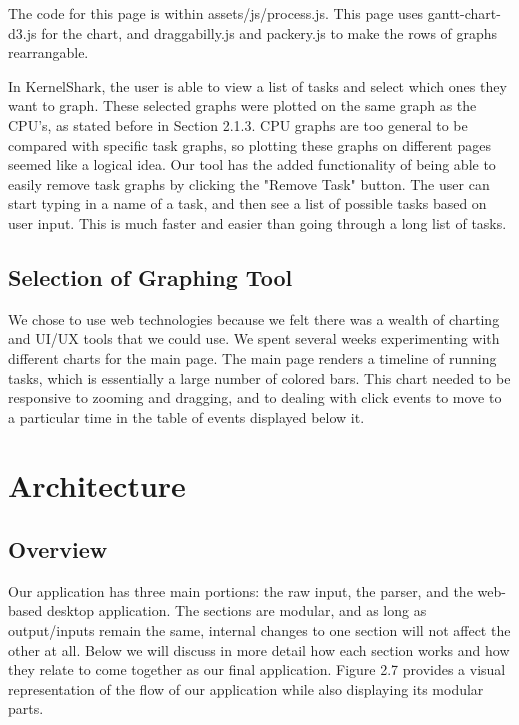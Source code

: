 \documentclass{hmcclinic}
\begin{document}
The code for this page is within assets/js/process.js. This page uses
    gantt-chart-d3.js for the chart, and draggabilly.js and packery.js to make the rows of graphs rearrangable.
    
    In KernelShark, the user is able to view a list of tasks and select which ones they want to graph. These selected graphs were plotted on the same graph as the CPU's, as stated before in Section 2.1.3. CPU graphs are too general to be compared with specific task graphs, so plotting these graphs on different pages seemed like a logical idea. Our tool has the added functionality of being able to easily remove task graphs by clicking the "Remove Task" button. The user can start typing in a name of a task, and then see a list of possible tasks based on user input. This is much faster and easier than going through a long list of tasks.
    
\subsection{Selection of Graphing Tool} %
  We chose to use web technologies because we felt there was a wealth of
  charting and UI/UX tools that we could use. We spent several weeks
  experimenting with different charts for the main page. The main page renders a
  timeline of running tasks, which is essentially a large number of colored
  bars. This chart needed to be responsive to zooming and dragging, and to
  dealing with click events to move to a particular time in the table of events
  displayed below it.

\section{Architecture} %

  \subsection{Overview}

  Our application has three main portions: the raw input, the parser,
  and the web-based desktop application. The sections are modular, and
  as long as output/inputs remain the same, internal changes to one section will
  not affect the other at all. Below we will discuss in more detail how each
  section works and how they relate to come together as our final application.
  Figure 2.7 provides a visual representation of the flow of our application
  while also displaying its modular parts.
  
\end{document}
